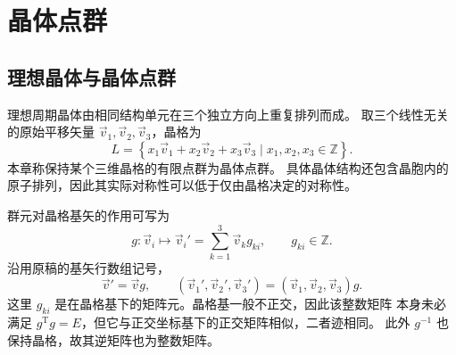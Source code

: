 \section{晶体点群}
\subsection{理想晶体与晶体点群}
理想周期晶体由相同结构单元在三个独立方向上重复排列而成。
取三个线性无关的原始平移矢量 $\vec v_1,\vec v_2,\vec v_3$，晶格为
\begin{equation}
L=\left\{x_1\vec v_1+x_2\vec v_2+x_3\vec v_3\mid x_1,x_2,x_3\in\mathbb{Z}\right\}.
\end{equation}
本章称保持某个三维晶格的有限点群为晶体点群。
具体晶体结构还包含晶胞内的原子排列，因此其实际对称性可以低于仅由晶格决定的对称性。

群元对晶格基矢的作用可写为
\begin{equation}
g:\vec v_i\mapsto\vec v_i'=\sum_{k=1}^{3}\vec v_k g_{ki},\qquad g_{ki}\in\mathbb{Z}.
\end{equation}
沿用原稿的基矢行数组记号，
\begin{equation}
\vec v'=\vec v g,\qquad
\left(\vec v_1',\vec v_2',\vec v_3'\right)=\left(\vec v_1,\vec v_2,\vec v_3\right)g.
\end{equation}
这里 $g_{ki}$ 是在晶格基下的矩阵元。晶格基一般不正交，因此该整数矩阵
本身未必满足 $g^{\mathrm{T}}g=E$，但它与正交坐标基下的正交矩阵相似，二者迹相同。
此外 $g^{-1}$ 也保持晶格，故其逆矩阵也为整数矩阵。

